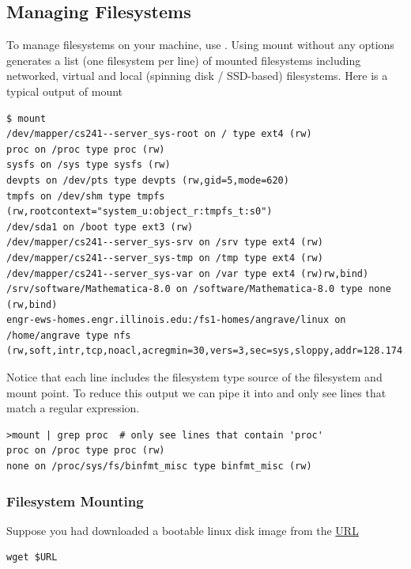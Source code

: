 \subsection{Managing Filesystems}

To manage filesystems on your machine, use . Using mount without any options generates a list (one filesystem per line) of mounted filesystems including networked, virtual and local (spinning disk / SSD-based) filesystems. Here is a typical output of mount

\begin{lstlisting}
$ mount
/dev/mapper/cs241--server_sys-root on / type ext4 (rw)
proc on /proc type proc (rw)
sysfs on /sys type sysfs (rw)
devpts on /dev/pts type devpts (rw,gid=5,mode=620)
tmpfs on /dev/shm type tmpfs (rw,rootcontext="system_u:object_r:tmpfs_t:s0")
/dev/sda1 on /boot type ext3 (rw)
/dev/mapper/cs241--server_sys-srv on /srv type ext4 (rw)
/dev/mapper/cs241--server_sys-tmp on /tmp type ext4 (rw)
/dev/mapper/cs241--server_sys-var on /var type ext4 (rw)rw,bind)
/srv/software/Mathematica-8.0 on /software/Mathematica-8.0 type none (rw,bind)
engr-ews-homes.engr.illinois.edu:/fs1-homes/angrave/linux on /home/angrave type nfs (rw,soft,intr,tcp,noacl,acregmin=30,vers=3,sec=sys,sloppy,addr=128.174.252.102)
\end{lstlisting}

Notice that each line includes the filesystem type source of the filesystem and mount point. To reduce this output we can pipe it into  and only see lines that match a regular expression.

\begin{lstlisting}
>mount | grep proc  # only see lines that contain 'proc'
proc on /proc type proc (rw)
none on /proc/sys/fs/binfmt_misc type binfmt_misc (rw)
\end{lstlisting}

\subsubsection{Filesystem Mounting}\label{how-do-i-mount-a-disk-image}

Suppose you had downloaded a bootable linux disk image from the \href{http://cosmos.cites.illinois.edu/pub/archlinux/iso/2015.04.01/archlinux-2015.04.01-dual.iso}{URL}

\begin{lstlisting}
wget $URL
\end{lstlisting}

